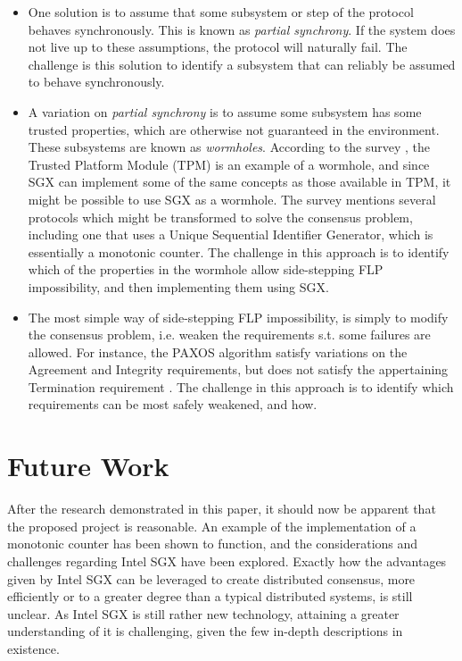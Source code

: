 \documentclass[12pt]{article}
\begin{document}
		\begin{itemize}
			\item One solution is to assume that some subsystem or step of the protocol behaves synchronously. 
			This is known as \textit{partial synchrony}. 
			If the system does not live up to these assumptions, the protocol will naturally fail. 
			The challenge is this solution to identify a subsystem that can reliably be assumed to behave synchronously. 
			\item A variation on \textit{partial synchrony} is to assume some subsystem has some trusted properties, which are otherwise not guaranteed in the environment. These subsystems are known as \textit{wormholes}. 
			According to the survey \cite{consensus-survey}, the Trusted Platform Module (TPM) is an example of a wormhole, and since SGX can implement some of the same concepts as those available in TPM, it might be possible to use SGX as a wormhole. 
			The survey mentions several protocols which might be transformed to solve the consensus problem, including one that uses a Unique Sequential Identifier Generator, which is essentially a monotonic counter. 
			The challenge in this approach is to identify which of the properties in the wormhole allow side-stepping FLP impossibility, and then implementing them using SGX.
			\item The most simple way of side-stepping FLP impossibility, is simply to modify the consensus problem, i.e. weaken the requirements s.t. some failures are allowed. 
			For instance, the PAXOS algorithm \cite{paxos} satisfy variations on the Agreement and Integrity requirements, but does not satisfy the appertaining Termination requirement \cite{fast-byz-cons}. 
			The challenge in this approach is to identify which requirements can be most safely weakened, and how.
		\end{itemize}
		
	\section{Future Work}
	After the research demonstrated in this paper, it should now be apparent that the proposed project is reasonable.
	An example of the implementation of a monotonic counter has been shown to function, and the considerations and challenges regarding Intel SGX have been explored.
	Exactly how the advantages given by Intel SGX can be leveraged to create distributed consensus, more efficiently or to a greater degree than a typical distributed systems, is still unclear.
	As Intel SGX is still rather new technology, attaining a greater understanding of it is challenging, given the few in-depth descriptions in existence.
\end{document}
